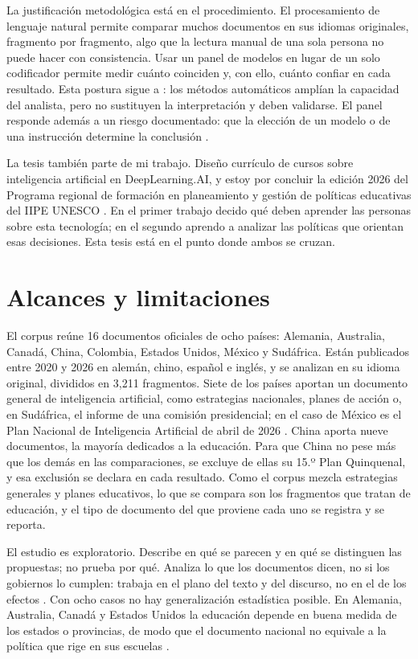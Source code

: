 La justificación metodológica está en el procedimiento. El procesamiento de lenguaje
natural permite comparar muchos documentos en sus idiomas originales, fragmento por
fragmento, algo que la lectura manual de una sola persona no puede hacer con consistencia.
Usar un panel de modelos en lugar de un solo codificador permite medir cuánto coinciden y,
con ello, cuánto confiar en cada resultado. Esta postura sigue a
\citet{grimmer2013text}: los métodos automáticos amplían la capacidad del analista, pero no
sustituyen la interpretación y deben validarse. El panel responde además a un riesgo
documentado: que la elección de un modelo o de una instrucción determine la conclusión
\citep{baumann2025llmhacking}.

La tesis también parte de mi trabajo. Diseño currículo de cursos sobre inteligencia
artificial en DeepLearning.AI, y estoy por concluir la edición 2026 del Programa regional
de formación en planeamiento y gestión de políticas educativas del IIPE UNESCO
\citep{iipe2026prf}. En el primer trabajo decido qué deben aprender las personas sobre esta
tecnología; en el segundo aprendo a analizar las políticas que orientan esas decisiones.
Esta tesis está en el punto donde ambos se cruzan.

\section{Alcances y limitaciones}
\label{sec:alcances}

El corpus reúne 16 documentos oficiales de ocho países: Alemania, Australia, Canadá, China,
Colombia, Estados Unidos, México y Sudáfrica. Están publicados entre 2020 y 2026 en alemán,
chino, español e inglés, y se analizan en su idioma original, divididos en 3{,}211
fragmentos. Siete de los países aportan un documento general de inteligencia artificial,
como estrategias nacionales, planes de acción o, en Sudáfrica, el informe de una comisión
presidencial; en el caso de México es el Plan Nacional de Inteligencia Artificial de abril de 2026
\citep{atdt2026plan}. China aporta nueve documentos, la mayoría dedicados a la educación.
Para que China no pese más que los demás en las comparaciones, se excluye de ellas su
15.º Plan Quinquenal, y esa exclusión se declara en cada resultado. Como el corpus mezcla
estrategias generales y planes educativos, lo que se compara son los fragmentos que tratan
de educación, y el tipo de documento del que proviene cada uno se registra y se reporta.

El estudio es exploratorio. Describe en qué se parecen y en qué se distinguen las
propuestas; no prueba por qué. Analiza lo que los documentos dicen, no si los gobiernos lo
cumplen: trabaja en el plano del texto y del discurso, no en el de los efectos
\citep{rizvi2010globalizing}. Con ocho casos no hay generalización estadística posible. En
Alemania, Australia, Canadá y Estados Unidos la educación depende en buena medida de los
estados o provincias, de modo que el documento nacional no equivale a la política que rige
en sus escuelas \citep{bray1995levels}.

